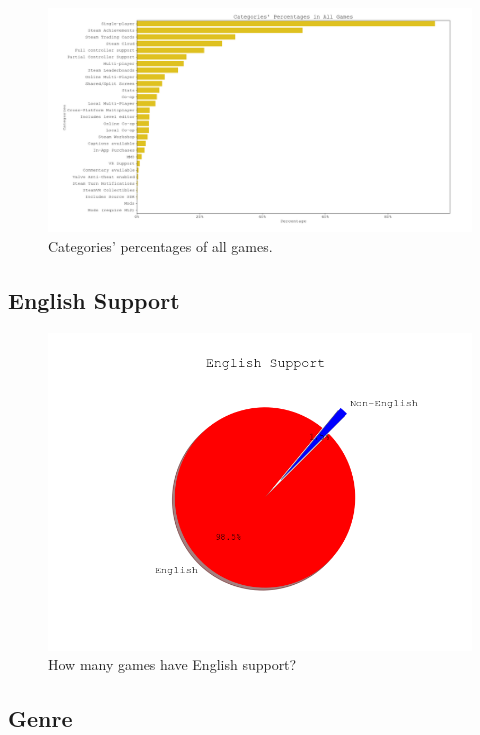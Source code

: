 \documentclass[conference]{IEEEtran}
\begin{document}
\begin{figure}[h]
  \includegraphics[width=\linewidth]{assets/categories_dist.png}
  \caption{Categories' percentages of all games.}
  \label{fig:category1}
\end{figure}


\subsection{English Support}


\begin{figure}[h]
  \includegraphics[width=\linewidth]{assets/english_support_pie.png}
  \caption{How many games have English support?}
  \label{fig:englishsupport1}
\end{figure}


\subsection{Genre}
\end{document}
